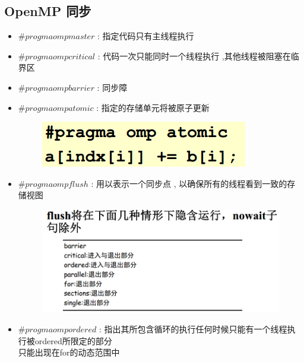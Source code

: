 \documentclass[UTF8,a4paper]{ctexart}
\begin{document}
\subsection{OpenMP 同步}
\begin{itemize}
  \item $\# progma omp master$ : 指定代码只有主线程执行
  \item $\# progma omp critical$ : 代码一次只能同时一个线程执行 ,其他线程被阻塞在临界区
  \item $\# progma omp barrier$ : 同步障
  \item $\# progma omp atomic$ : 指定的存储单元将被原子更新
  \begin{figure}[H]
    \centering
    \includegraphics[scale = 0.3]{assets/ParallelComputing_30e91.png}
  \end{figure}

  \item $\# progma omp flush$ : 用以表示一个同步点 , 以确保所有的线程看到一致的存储视图
  \begin{figure}[H]
    \centering
    \includegraphics[scale = 0.3]{assets/ParallelComputing_998d6.png}
  \end{figure}
  \item $\# progma omp ordered$ : 指出其所包含循环的执行任何时候只能有一个线程执行被ordered所限定的部分\\
  只能出现在for的动态范围中
\end{itemize}
\end{document}
